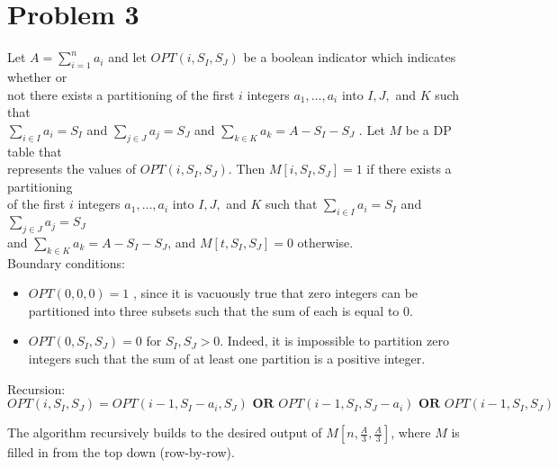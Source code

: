 \documentclass[twoside,11pt]{homework}
\begin{document}
\section*{Problem 3}
Let $A = \sum_{i=1}^n a_i$ and let $OPT(i,  S_I,  S_J)$ be a boolean indicator which indicates whether or \\[0.2em]
not there exists a partitioning of the first $i$ integers $a_1, \dots,  a_i$ into $I, J, $ and $K$ such that \\[0.2em]
$\sum_{i \in I} a_i  = S_I$ and $\sum_{j \in J} a_j  = S_J$ and $\sum_{k \in K} a_k  = A - S_I - S_J$ .   Let $M$ be a DP table that \\[0.2em]
represents the values of $OPT(i,  S_I,  S_J)$. Then $M[i,  S_I,  S_J] = 1$ if there exists a partitioning \\[0.2em]
of the first $i$ integers $a_1,  \dots,  a_i$ into $I, J, $ and $K$ such that $\sum_{i \in I} a_i  = S_I$ and $\sum_{j \in J} a_j  = S_J$ \\[0.2em]
and $\sum_{k \in K} a_k  = A - S_I - S_J$,  and $M[t,  S_I,  S_J] = 0$ otherwise.  \\[0.8em] %
\noindent
Boundary conditions: 
\begin{itemize}
\item $OPT(0, 0, 0) = 1$ ,  since it is vacuously true that zero integers can be partitioned into three subsets such that the sum of each is equal to $0$. 
\item $OPT(0, S_I,  S_J) = 0$ for $S_I ,  S_J > 0$.  Indeed,  it is impossible to partition zero integers such that the sum of at least one partition is a positive integer. 
\end{itemize}
Recursion:
$$OPT(i, S_I, S_J) = OPT(i-1, S_I-a_i, S_J) \textbf{ OR } OPT(i-1, S_I, S_J-a_i) \textbf{ OR }  OPT(i-1, S_I, S_J) $$

\noindent
The algorithm recursively builds to the desired output of $M\left[n,  \frac{A}{3}, \frac{A}{3} \right]$, where $M$ is filled in from the top down (row-by-row).  
\end{document}
